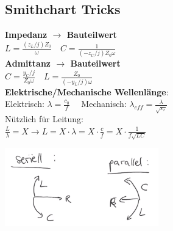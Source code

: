 \documentclass[english]{latex4ei/latex4ei_sheet}
\begin{document}
\begin{sectionbox}
	\subsection{Smithchart Tricks}

	\textbf{Impedanz $\rightarrow$ Bauteilwert}\\
	$L=\frac{(z_L / j)Z_0}{\omega} \quad C=\frac{1}{(-z_C / j)Z_0\omega}$\\
	\textbf{Admittanz $\rightarrow$ Bauteilwert}\\
	$C=\frac{y_C / j}{Z_0 \omega} \quad L = \frac{Z_0}{(-y_L / j) \omega}$\\
	\textbf{Elektrische/Mechanische Wellenlänge}:\\
	Elektrisch: $\lambda = \frac{c_0}{f}\quad$ Mechanisch: $\lambda_{eff} = \frac{\lambda}{\sqrt{\varepsilon_r}}$ \\
	Nützlich für Leitung:\\
	$\frac{L}{\lambda}=X \rightarrow L = X \cdot \lambda = X \cdot \frac{c}{f} = X \cdot \frac{1}{f\sqrt{LC}}$
	\begin{center}\includegraphics[width = 0.5\textwidth]{./img/smith_para_serie.png}\end{center}

\end{sectionbox}
\end{document}
